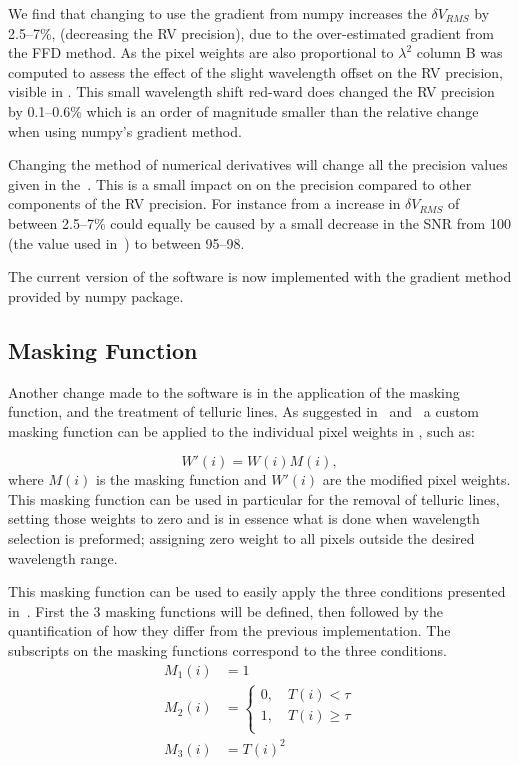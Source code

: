 We find that changing to use the gradient from numpy increases the \(\delta V_{RMS}\) by 2.5--7\%, (decreasing the RV precision), due to the over-estimated gradient from the FFD method. As the pixel weights  are also proportional to \({\lambda}^{2}\) column B was computed to assess the effect of the slight wavelength offset on the RV precision, visible in . This small wavelength shift red-ward does changed the RV precision by 0.1--0.6\% which is an order of magnitude smaller than the relative change when using numpy's gradient method.

Changing the method of numerical derivatives will change all the precision values given in the~\citet{figueira_radial_2016}. This is a small impact on on the precision compared to other components of the RV precision. For instance from  a increase in \(\delta V_{RMS}\) of between 2.5--7\%  could equally be caused by a small decrease in the SNR from 100 (the value used in~\citet{figueira_radial_2016}) to between 95--98.

The current version of the software is now implemented with the gradient method provided by numpy package.

\subsection{Masking Function}
\label{subsec:masking_function}
Another change made to the software is in the application of the masking function, and the treatment of telluric lines. As suggested in~\cite{connes_absolute_1985} and~\cite{bouchy_fundamental_2001} a custom masking function can be applied to the individual pixel weights in , such as:

\[W'(i) = W(i)M(i),\label{eq:mask_function}\] where \(M(i)\) is the masking function and \(W'(i)\) are the modified pixel weights.
This masking function can be used in particular for the removal of telluric lines, setting those weights to zero and is in essence what is done when wavelength selection is preformed; assigning zero weight to all pixels outside the desired wavelength range.

This masking function can be used to easily apply the three conditions presented in~\citet{figueira_radial_2016}. First  the 3 masking functions will be defined, then followed by the quantification of how they differ from the previous implementation. The subscripts on the masking functions correspond to the three conditions.
\begin{align}
M_1(i) &= 1 \label{eq:mask1}\\
M_2(i) &= \begin{cases}
0, \hspace{1em} T(i) < \tau\\
1, \hspace{1em} T(i) \ge \tau\\
\end{cases}\label{eq:mask2}\\
M_3(i) &= {T(i)}^{2} \label{eq:mask3}
\end{align}

